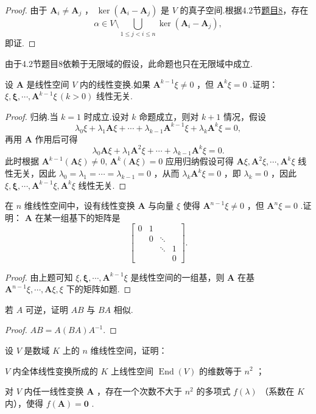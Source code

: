 \begin{proof}
	由于 $\bm A_i\ne\bm A_j$ ， $\ker(\bm A_i-\bm A_j)$ 是 $V$ 的真子空间.根据4.2节\hyperlink{FiniteSubspace}{题目8}，存在
	\[
		\alpha\in V\setminus\bigcup_{1\le j<i\le n}\ker(\bm A_i-\bm A_j),
	\]
	即证.
\end{proof}
\begin{note}
	由于4.2节题目8依赖于无限域的假设，此命题也只在无限域中成立.
\end{note}
\begin{prob}[24]
	设 $\bm A$ 是线性空间 $V$ 内的线性变换.如果 $\bm A^{k-1}\xi\ne0$ ，但 $\bm A^k\xi=0$ .证明： $\xi,\bm \xi,\cdots,\bm A^{k-1}\xi\,(k>0)$ 线性无关.
\end{prob}
\begin{proof}
	归纳.当 $k=1$ 时成立.设对 $k$ 命题成立，则对 $k+1$ 情况，假设
	\[
		\lambda_0\xi+\lambda_1\bm A\xi+\cdots+\lambda_{k-1}\bm A^{k-1}\xi+\lambda_k\bm A^k\xi=0,
	\]
	再用 $\bm A$ 作用后可得
	\[
		\lambda_0\bm A\xi+\lambda_1\bm A^2\xi+\cdots+\lambda_{k-1}\bm A^k\xi=0.
	\]
	此时根据 $\bm A^{k-1}(\bm A\xi)\ne0,\,\bm A^k(\bm A\xi)=0$ 应用归纳假设可得 $\bm A\xi,\bm A^2\xi,\cdots,\bm A^k\xi$ 线性无关，因此 $\lambda_0=\lambda_1=\cdots=\lambda_{k-1}=0$ ，从而 $\lambda_k\bm A^k\xi=0$ ，即 $\lambda_k=0$ ，因此 $\xi,\bm \xi,\cdots,\bm A^{k-1}\xi,\bm A^k\xi$ 线性无关.
\end{proof}
\begin{prob}[25]
	在 $n$ 维线性空间中，设有线性变换 $\bm A$ 与向量 $\xi$ 使得 $\bm A^{n-1}\xi\ne0$ ，但 $\bm A^n\xi=0$ .证明： $\bm A$ 在某一组基下的矩阵是
	\[
		\begin{bmatrix}
			0 & 1 &        &   \\
			  & 0 & \ddots &   \\
			  &   & \ddots & 1 \\
			  &   &        & 0
		\end{bmatrix}.
	\]
\end{prob}
\begin{proof}
	由上题可知 $\xi,\bm \xi,\cdots,\bm A^{k-1}\xi$ 是线性空间的一组基，则 $\bm A$ 在基 $\bm A^{n-1}\xi,\cdots,\bm A\xi,\xi$ 下的矩阵如题.
\end{proof}
\begin{prob}[30]
	若 $A$ 可逆，证明 $AB$ 与 $BA$ 相似.
\end{prob}
\begin{proof}
	$AB=A(BA)A^{-1}$.
\end{proof}
\begin{prob}[32]
	设 $V$ 是数域 $K$ 上的 $n$ 维线性空间，证明：
	\begin{mylist}
		\item  $V$ 内全体线性变换所成的 $K$ 上线性空间 $\operatorname*{End}(V)$ 的维数等于 $n^2$ ；
		\item 对 $V$ 内任一线性变换 $\bm A$ ，存在一个次数不大于 $n^2$ 的多项式 $f(\lambda)$ （系数在 $K$ 内），使得 $f(\bm A)=\bm 0$ .
	\end{mylist}
\end{prob}
